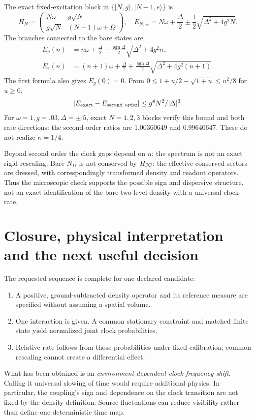\documentclass[11pt,a4paper]{article}
\newcommand{\ket}[1]{|#1\rangle}
\begin{document}
The exact fixed-excitation block in
$\{\ket{N,g},\ket{N-1,e}\}$ is
\begin{equation}
 H_N=\begin{pmatrix}
 N\omega&g\sqrt N\\g\sqrt N&(N-1)\omega+\Omega
 \end{pmatrix},\quad
 E_{N,\pm}=N\omega+\frac{\Delta}{2}
       \pm\frac12\sqrt{\Delta^2+4g^2N}.
\end{equation}
The branches connected to the bare states are
\begin{align}
 E_g(n)&=n\omega+\frac\Delta2
    -\frac{\operatorname{sgn}\Delta}{2}\sqrt{\Delta^2+4g^2n},\\
 E_e(n)&=(n+1)\omega+\frac\Delta2
    +\frac{\operatorname{sgn}\Delta}{2}\sqrt{\Delta^2+4g^2(n+1)} .
\end{align}
The first formula also gives $E_g(0)=0$.
From $0\leq1+u/2-\sqrt{1+u}\leq u^2/8$ for $u\geq0$,
\begin{equation}
 |E_{\rm exact}-E_{\rm second\ order}|
 \leq g^4N^2/|\Delta|^3 .
\end{equation}
For $\omega=1,g=.03,\Delta=\pm.5$, exact $N=1,2,3$ blocks verify
this bound and both rate directions: the second-order ratios are
$1.00360649$ and $0.99640647$. These do not realize $\kappa=1/4$.

Beyond second order the clock gaps depend on $n$; the spectrum is not
an exact rigid rescaling. Bare $N_D$ is not conserved by $H_{\rm JC}$:
the effective conserved sectors are dressed, with correspondingly
transformed density and readout operators. Thus the microscopic check
supports the possible sign and dispersive structure, not an exact
identification of the bare two-level density with a universal clock rate.

\newpage
\section{Closure, physical interpretation and the next useful decision}
The requested sequence is complete for one declared candidate:
\begin{enumerate}
 \item A positive, ground-subtracted density operator and its reference
 measure are specified without assuming a spatial volume.
 \item One interaction is given. A common stationary constraint and
 matched finite state yield normalized joint clock probabilities.
 \item Relative rate follows from those probabilities under fixed
 calibration; common rescaling cannot create a differential effect.
\end{enumerate}
What has been obtained is an \emph{environment-dependent clock-frequency
shift}. Calling it universal slowing of time would require additional
physics. In particular, the coupling's sign and dependence on the clock
transition are not fixed by the density definition. Source fluctuations
can reduce visibility rather than define one deterministic time map.
\end{document}
